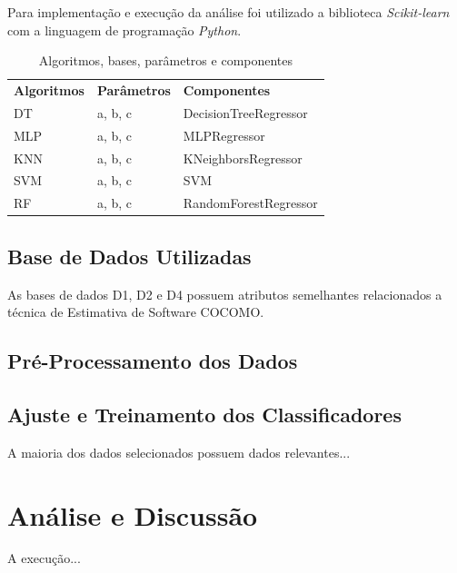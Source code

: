 \documentclass[12pt]{article}
\begin{document}
Para implementação e execução da análise foi utilizado a biblioteca \textit{Scikit-learn} \cite{scikitlearn:2011} com a linguagem de programação \textit{Python}.

\begin{table}[h!]
  \begin{center}
    \caption{Algoritmos, bases, parâmetros e componentes}
    \label{tab_algoritmos}
    \begin{tabular}{l|l|l}
      \textbf{Algoritmos} & \textbf{Parâmetros} & \textbf{Componentes}  \\
      DT                  & a, b, c             & DecisionTreeRegressor \\
      MLP                 & a, b, c             & MLPRegressor          \\
      KNN                 & a, b, c             & KNeighborsRegressor   \\
      SVM                 & a, b, c             & SVM                   \\
      RF                  & a, b, c             & RandomForestRegressor \\
    \end{tabular}
  \end{center}
\end{table}

\subsection{Base de Dados Utilizadas}

As bases de dados D1, D2 e D4 possuem atributos semelhantes relacionados a técnica de Estimativa de Software COCOMO.  

\subsection{Pré-Processamento dos Dados}


\subsection{Ajuste e Treinamento dos Classificadores}

A maioria dos dados selecionados possuem dados relevantes...

\section{Análise e Discussão}

A execução...
\end{document}
